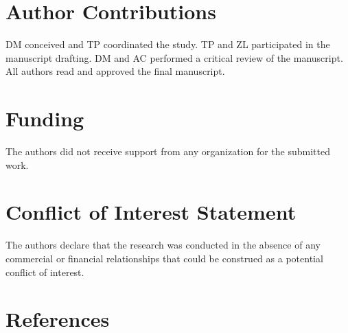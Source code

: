 \documentclass[
  english,
  jou,floatsintext]{apa6}
\begin{document}
\hypertarget{author-contributions}{%
\section{Author Contributions}\label{author-contributions}}

DM conceived and TP coordinated the study. TP and ZL participated in the manuscript drafting. DM and AC performed a critical review of the manuscript. All authors read and approved the final manuscript.

\hypertarget{funding}{%
\section{Funding}\label{funding}}

The authors did not receive support from any organization for the submitted work.

\hypertarget{conflict-of-interest-statement}{%
\section{Conflict of Interest Statement}\label{conflict-of-interest-statement}}

The authors declare that the research was conducted in the absence of any commercial or financial relationships that could be construed as a potential conflict of interest.

\newpage

\hypertarget{references}{%
\section{References}\label{references}}

\begingroup
\setlength{\parindent}{-0.5in}
\setlength{\leftskip}{0.5in}
\end{document}
